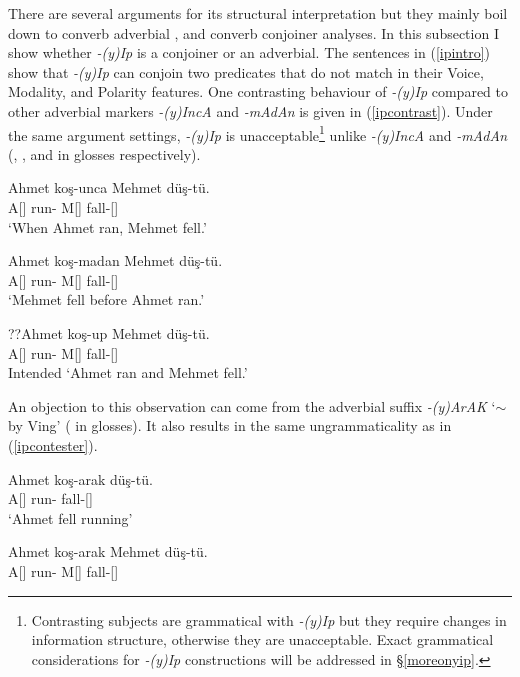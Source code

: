 There are several arguments for its structural interpretation but they mainly boil down to converb adverbial \citep{demir2014adverbial, underhill1976turkish, goksel2004turkish}, and converb conjoiner \citep{fokkens2009inflectional, johanson1995turkic, kornfilt1997turkish} analyses. In this subsection I show whether \textit{-(y)Ip} is a conjoiner or an adverbial. The sentences in (\ref{ipintro}) show that \textit{-(y)Ip} can conjoin two predicates that do not match in their Voice, Modality, and Polarity features. One contrasting behaviour of \textit{-(y)Ip} compared to other adverbial markers \textit{-(y)IncA} and \textit{-mAdAn} is given in (\ref{ipcontrast}). Under the same argument settings, \textit{-(y)Ip} is unacceptable\footnote{Contrasting subjects are grammatical with \textit{-(y)Ip} but they require changes in information structure, otherwise they are unacceptable. Exact grammatical considerations for \textit{-(y)Ip} constructions will be addressed in \S\ref{moreonyip}.} unlike \textit{-(y)IncA} and \textit{-mAdAn} ({\Pc}, {\When}, and {\Wo} in glosses respectively).

\begin{exe}
    \ex \label{ipcontrast}
    \begin{xlist}
        \ex \gll Ahmet koş-unca Mehmet düş-tü. \\ 
        A[{\Nom}] run-{\When} M[{\Nom}] fall-{\Pst}[{\Tsg}] \\
        \glt `When Ahmet ran, Mehmet fell.'
        
        \ex \gll Ahmet koş-madan Mehmet düş-tü. \\
        A[{\Nom}] run-{\Wo} M[{\Nom}] fall-{\Pst}[{\Tsg}] \\
        \glt `Mehmet fell before Ahmet ran.'
        
        \ex \gll ??Ahmet koş-up Mehmet düş-tü. \\ 
        A[{\Nom}] run-{\Pc} M[{\Nom}] fall-{\Pst}[{\Tsg}] \\
        \glt Intended `Ahmet ran and Mehmet fell.'
    \end{xlist}
\end{exe}

An objection to this observation can come from the adverbial suffix \textit{-(y)ArAK} `$\sim$ by Ving' ({\By} in glosses). It also results in the same ungrammaticality as in (\ref{ipcontester}).

\begin{exe}
    \ex \label{ipcontester}
    \begin{xlist}
    \ex \gll Ahmet koş-arak düş-tü. \\
    A[{\Nom}] run-{\By} fall-{\Pst}[{\Tsg}] \\
    \glt `Ahmet fell running'
    
    \ex \gll *Ahmet koş-arak Mehmet düş-tü. \\ 
    A[{\Nom}] run-{\By} M[{\Nom}] fall-{\Pst}[{\Tsg}] \\
    \end{xlist}
\end{exe}

